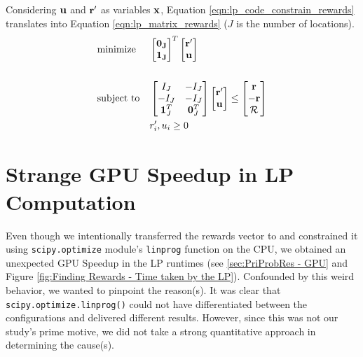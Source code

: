 \begin{appendices}
    Considering $\mathbf{u}$ and $\mathbf{r'}$ as variables $\mathbf{x}$, Equation \ref{eqn:lp_code_constrain_rewards} translates into Equation \ref{eqn:lp_matrix_rewards} ($J$ is the number of locations).
    \begin{equation} \label{eqn:lp_matrix_rewards}
    \begin{aligned}
    & \text{minimize}
    & & \begin{bmatrix}
    \mathbf{0_J}\\
    \mathbf{1_J}\\
    \end{bmatrix}^T
    \begin{bmatrix}
    \mathbf{r'}\\
    \mathbf{u}
    \end{bmatrix}\\ \\
    & \text{subject to}
    & & \begin{bmatrix}
    I_J & -I_J\\
    -I_J & -I_J\\
    \mathbf{1}^T_J & \mathbf{0}^T_J\\
    \end{bmatrix}
    \begin{bmatrix}
    \mathbf{r'}\\
    \mathbf{u}\\
    \end{bmatrix} \leq
    \begin{bmatrix}
    \mathbf{r}\\
    -\mathbf{r}\\
    \mathcal{R}\\
    \end{bmatrix}\\
    &&& r'_i, u_i \geq 0
    \end{aligned}
    \end{equation}
    
    \section{Strange GPU Speedup in LP Computation} \label{app:Strange GPU Speedup in LP Computation}
    Even though we intentionally transferred the rewards vector to and constrained it using \texttt{scipy.optimize} module's \texttt{linprog} function on the CPU, we obtained an unexpected GPU Speedup in the LP runtimes (see \cref{sec:PriProbRes - GPU} and Figure \ref{fig:Finding Rewards - Time taken by the LP}). Confounded by this weird behavior, we wanted to pinpoint the reason(s). It was clear that \texttt{scipy.optimize.linprog()} could not have differentiated between the configurations and delivered different results. However, since this was not our study's prime motive, we did not take a strong quantitative approach in determining the cause(s).
    

\end{appendices}
